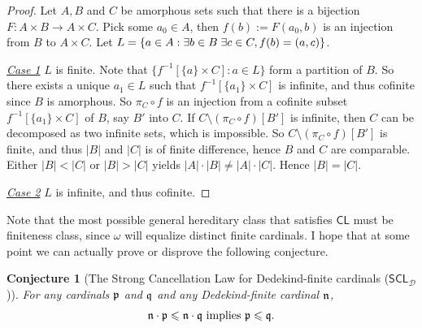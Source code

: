 \documentclass{amsart}
\newcommand{\CL}{\ensuremath{\mathsf{CL}}}
\newcommand{\SCL}{\ensuremath{\mathsf{SCL}}}
\renewcommand{\leq}{\leqslant}
\newcommand{\1}{\ensuremath{\mathds{1}}}
\theoremstyle{plain}
\theoremstyle{boldrk}
\newtheorem*{conj}{Conjecture} %
\theoremstyle{definition}
\begin{document}
\begin{proof}
    Let $A,B$ and $C$ be amorphous sets such that there is a bijection $F:A\times B\to A\times C$. Pick some $a_{0}\in A$, then $f(b):=F(a_{0},b)$ is an injection from $B$ to $A\times C$. Let $L=\{a\in A:\exists b\in B \hspace{0.1cm}\exists c\in C, f(b)=(a,c)\}$.

    \emph{\underline{Case 1}} $L$ is finite. Note that $\{f^{-1}[\{a\}\times C]:a\in L\}$ form a partition of $B$. So there exists a unique $a_{1}\in L$ such that $f^{-1}[\{a_{1}\}\times C]$ is infinite, and thus cofinite since $B$ is amorphous. So $\pi_{C}\circ f$ is an injection from a cofinite subset $f^{-1}[\{a_{1}\}\times C]$ of $B$, say $B'$ into $C$. If $C\setminus(\pi_{C}\circ f)[B']$ is infinite, then $C$ can be decomposed as two infinite sets, which is impossible. So $C\setminus(\pi_{C}\circ f)[B']$ is finite, and thus $|B|$ and $|C|$ is of finite difference, hence $B$ and $C$ are comparable. Either $|B|<|C|$ or $|B|>|C|$ yields $|A|\cdot|B|\neq|A|\cdot|C|$. Hence $|B|=|C|$.

    \emph{\underline{Case 2}} $L$ is infinite, and thus cofinite. 
\end{proof}

Note that the most possible general hereditary class that satisfies $\CL$ must be finiteness class, since $\omega$ will equalize distinct finite cardinals.
I hope that at some point we can actually prove or disprove the following conjecture.\\
\begin{conj}[The Strong Cancellation Law for Dedekind-finite cardinals ($\SCL_{\mathcal{D}}$)]
    For any cardinals $\frak{p}$ and $\frak{q}$ and any Dedekind-finite cardinal $\frak{n}$, $$\frak{n}\cdot\frak{p}\leq\frak{n}\cdot\frak{q}\text{ implies }\frak{p}\leq\frak{q}.$$ 
\end{conj}






\end{document}
